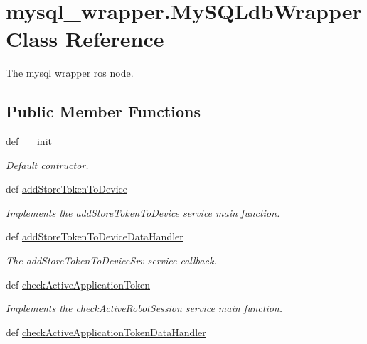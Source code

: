 \hypertarget{classmysql__wrapper_1_1MySQLdbWrapper}{\section{mysql\-\_\-wrapper.\-My\-S\-Q\-Ldb\-Wrapper Class Reference}
\label{classmysql__wrapper_1_1MySQLdbWrapper}
}


The mysql wrapper ros node.  


\subsection*{Public Member Functions}
\begin{DoxyCompactItemize}
\item 
def \hyperlink{classmysql__wrapper_1_1MySQLdbWrapper_a2b6fd40da2a2f542b28b36ce0f1a934e}{\-\_\-\-\_\-init\-\_\-\-\_\-}
\begin{DoxyCompactList}\small\item\em Default contructor. \end{DoxyCompactList}\item 
def \hyperlink{classmysql__wrapper_1_1MySQLdbWrapper_a6bc36cff3edc5a9640a47c69f1a51de2}{add\-Store\-Token\-To\-Device}
\begin{DoxyCompactList}\small\item\em Implements the add\-Store\-Token\-To\-Device service main function. \end{DoxyCompactList}\item 
def \hyperlink{classmysql__wrapper_1_1MySQLdbWrapper_a9eb24b5da20ddc08782a2c79316f09c9}{add\-Store\-Token\-To\-Device\-Data\-Handler}
\begin{DoxyCompactList}\small\item\em The add\-Store\-Token\-To\-Device\-Srv service callback. \end{DoxyCompactList}\item 
def \hyperlink{classmysql__wrapper_1_1MySQLdbWrapper_a8ec3882112d792dea46c90a1913ebffa}{check\-Active\-Application\-Token}
\begin{DoxyCompactList}\small\item\em Implements the check\-Active\-Robot\-Session service main function. \end{DoxyCompactList}\item 
def \hyperlink{classmysql__wrapper_1_1MySQLdbWrapper_a783c39a163fce71b51a328f473611716}{check\-Active\-Application\-Token\-Data\-Handler}

\end{DoxyCompactItemize}
